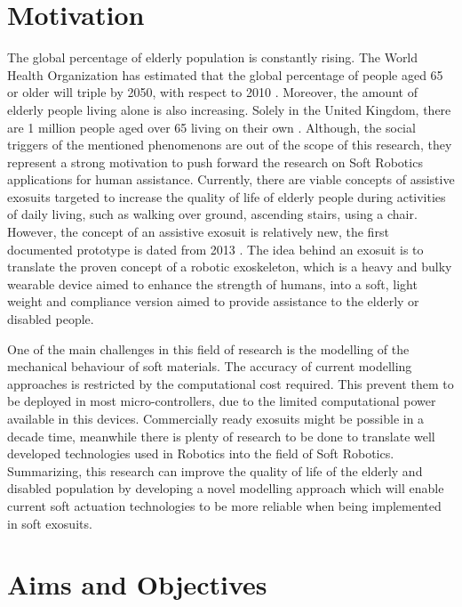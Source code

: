 \section{Motivation}

The global percentage of elderly population is constantly rising. The World Health Organization has estimated that the global percentage of people aged 65 or older will triple by 2050, with respect to 2010 \cite{Colombo2012}. Moreover, the amount of elderly people living alone is also increasing. Solely in the United Kingdom, there are 1 million people aged over 65 living on their own \cite{Hill2019}. Although, the social triggers of the mentioned phenomenons are out of the scope of this research, they represent a strong motivation to push forward the research on Soft Robotics applications for human assistance. Currently, there are viable concepts of assistive exosuits targeted to increase the quality of life of elderly people during activities of daily living, such as walking over ground, ascending stairs, using a chair. However, the concept of an assistive exosuit is relatively new, the first documented prototype is dated from 2013 \cite{wehner2013lightweight}. The idea behind an exosuit is to translate the proven concept of a robotic exoskeleton, which is a heavy and bulky wearable device aimed to enhance the strength of humans, into a soft, light weight and compliance version aimed to provide assistance to the elderly or disabled people. 

One of the main challenges in this field of research is the modelling of the mechanical behaviour of soft materials. The accuracy of current modelling approaches is restricted by the computational cost required. This prevent them to be deployed in most micro-controllers, due to the limited computational power available in this devices. Commercially ready exosuits might be possible in a decade time, meanwhile there is plenty of research to be done to translate well developed technologies used in Robotics into the field of Soft Robotics. Summarizing, this research can improve the quality of life of the elderly and disabled population by developing a novel modelling approach which will enable current soft actuation technologies to be more reliable when being implemented in soft exosuits.

\newpage

\section{Aims and Objectives}

